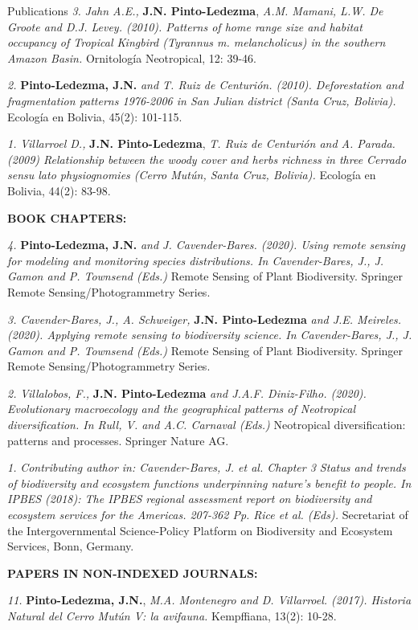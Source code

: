 \documentclass{resume} %
\begin{document}
\begin{rSection}{Publications}
{\em 3.} {\em Jahn A.E.,} {\bf{J.N. Pinto-Ledezma}}, {\em A.M. Mamani, L.W. De Groote and D.J. Levey. (2010). Patterns of home range size and habitat occupancy of Tropical Kingbird ({\em Tyrannus m. melancholicus}) in the southern Amazon Basin.} {Ornitología Neotropical, 12: 39-46}. 

{\em 2.} {\bf{Pinto-Ledezma, J.N.}} {\em and T. Ruiz de Centurión. (2010). Deforestation and fragmentation patterns 1976-2006 in San Julian district (Santa Cruz, Bolivia).} {Ecología en Bolivia, 45(2): 101-115}.

{\em 1.} {\em Villarroel D.,} {\bf{J.N. Pinto-Ledezma}}, {\em T. Ruiz de Centurión and A. Parada. (2009) Relationship between the woody cover and herbs richness in three Cerrado {\em sensu lato} physiognomies (Cerro Mutún, Santa Cruz, Bolivia).} {Ecología en Bolivia, 44(2): 83-98}. 

{\bf BOOK CHAPTERS:}

{\em 4.} {\bf{Pinto-Ledezma, J.N.}} {\em and J. Cavender-Bares. (2020). Using remote sensing for modeling and monitoring species distributions. In Cavender-Bares, J., J. Gamon and P. Townsend (Eds.)} {Remote Sensing of Plant Biodiversity. Springer Remote Sensing/Photogrammetry Series}.

{\em 3.} {\em Cavender-Bares, J., A. Schweiger,} {\bf{J.N. Pinto-Ledezma}} {\em and J.E. Meireles. (2020). Applying remote sensing to biodiversity science. In Cavender-Bares, J., J. Gamon and P. Townsend (Eds.)} {Remote Sensing of Plant Biodiversity. Springer Remote Sensing/Photogrammetry Series}. 

{\em 2.} {\em Villalobos, F.,} {\bf{J.N. Pinto-Ledezma}} {\em and J.A.F. Diniz-Filho. (2020). Evolutionary macroecology and the geographical patterns of Neotropical diversification. In Rull, V. and A.C. Carnaval (Eds.)} {Neotropical diversification: patterns and processes. Springer Nature AG}. 

{\em 1.} {\em Contributing author in: Cavender-Bares, J. et al. Chapter 3 Status and trends of biodiversity and ecosystem functions underpinning nature’s benefit to people. In IPBES (2018): {\em The IPBES regional assessment report on biodiversity and ecosystem services for the Americas}. 207-362 Pp. Rice et al. (Eds).} {Secretariat of the Intergovernmental Science-Policy Platform on Biodiversity and Ecosystem Services, Bonn, Germany}. 

{\bf PAPERS IN NON-INDEXED JOURNALS:}

{\em 11.} {\bf{Pinto-Ledezma, J.N.}}, {\em M.A. Montenegro and D. Villarroel. (2017). Historia Natural del Cerro Mutún V: la avifauna.} {Kempffiana, 13(2): 10-28}.


\end{rSection}
\end{document}
